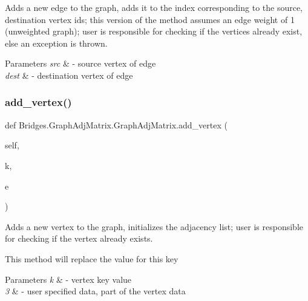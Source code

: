 Adds a new edge to the graph, adds it to the index corresponding to the source, destination vertex ids; this version of the method assumes an edge weight of 1 (unweighted graph); user is responsible for checking if the vertices already exist, else an exception is thrown. 


\begin{DoxyParams}{Parameters}
{\em src} & -\/ source vertex of edge \\
\hline
{\em dest} & -\/ destination vertex of edge \\
\hline
\end{DoxyParams}
\mbox{\label{class_bridges_1_1_graph_adj_matrix_1_1_graph_adj_matrix_a2fe88ea2d4d6e60bebd80b17293b3fed}} 
\subsubsection{\texorpdfstring{add\+\_\+vertex()}{add\_vertex()}}
{\footnotesize\ttfamily def Bridges.\+Graph\+Adj\+Matrix.\+Graph\+Adj\+Matrix.\+add\+\_\+vertex (\begin{DoxyParamCaption}\item[{}]{self,  }\item[{}]{k,  }\item[{}]{e }\end{DoxyParamCaption})}



Adds a new vertex to the graph, initializes the adjacency list; user is responsible for checking if the vertex already exists. 

This method will replace the value for this key


\begin{DoxyParams}{Parameters}
{\em k} & -\/ vertex key value \\
\hline
{\em 3} & -\/ user specified data, part of the vertex data \\
\hline
\end{DoxyParams}
\mbox{\label{class_bridges_1_1_graph_adj_matrix_1_1_graph_adj_matrix_aa3d184df6b73dd3692335b188addbbb9}} 
